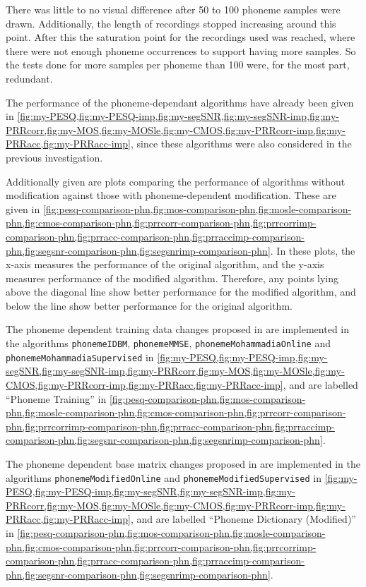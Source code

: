 There was little to no visual difference after 50 to 100 phoneme samples
were drawn. Additionally, the length of recordings stopped increasing
around this point. After this the saturation point for the recordings
used was reached, where there were not enough phoneme occurrences
to support having more samples. So the tests done for more samples
per phoneme than 100 were, for the most part, redundant.

The performance of the phoneme-dependant algorithms have already been
given in \cref{fig:my-PESQ,fig:my-PESQ-imp,fig:my-segSNR,fig:my-segSNR-imp,fig:my-PRRcorr,fig:my-MOS,fig:my-MOSle,fig:my-CMOS,fig:my-PRRcorr-imp,fig:my-PRRacc,fig:my-PRRacc-imp},
since these algorithms were also considered in the previous investigation.

Additionally given are plots comparing the performance of algorithms
without modification against those with phoneme-dependent modification.
These are given in \cref{fig:pesq-comparison-phn,fig:mos-comparison-phn,fig:mosle-comparison-phn,fig:cmos-comparison-phn,fig:prrcorr-comparison-phn,fig:prrcorrimp-comparison-phn,fig:prracc-comparison-phn,fig:prraccimp-comparison-phn,fig:segsnr-comparison-phn,fig:segsnrimp-comparison-phn}.
In these plots, the x-axis measures the performance of the original
algorithm, and the y-axis measures performance of the modified algorithm.
Therefore, any points lying above the diagonal line show better performance
for the modified algorithm, and below the line show better performance
for the original algorithm.

The phoneme dependent training data changes proposed in 
are implemented in the algorithms \lstinline[breaklines=true]!phonemeIDBM!,
\lstinline[breaklines=true]!phonemeMMSE!, \lstinline[breaklines=true]!phonemeMohammadiaOnline!
and\linebreak{}
\lstinline[breaklines=true]!phonemeMohammadiaSupervised! in \cref{fig:my-PESQ,fig:my-PESQ-imp,fig:my-segSNR,fig:my-segSNR-imp,fig:my-PRRcorr,fig:my-MOS,fig:my-MOSle,fig:my-CMOS,fig:my-PRRcorr-imp,fig:my-PRRacc,fig:my-PRRacc-imp},
and are labelled ``Phoneme Training'' in \cref{fig:pesq-comparison-phn,fig:mos-comparison-phn,fig:mosle-comparison-phn,fig:cmos-comparison-phn,fig:prrcorr-comparison-phn,fig:prrcorrimp-comparison-phn,fig:prracc-comparison-phn,fig:prraccimp-comparison-phn,fig:segsnr-comparison-phn,fig:segsnrimp-comparison-phn}.

The phoneme dependent base matrix changes proposed in 
are implemented in the algorithms \lstinline[breaklines=true]!phonemeModifiedOnline!
and \lstinline[breaklines=true]!phonemeModifiedSupervised! in \cref{fig:my-PESQ,fig:my-PESQ-imp,fig:my-segSNR,fig:my-segSNR-imp,fig:my-PRRcorr,fig:my-MOS,fig:my-MOSle,fig:my-CMOS,fig:my-PRRcorr-imp,fig:my-PRRacc,fig:my-PRRacc-imp},
and are labelled ``Phoneme Dictionary (Modified)'' in \cref{fig:pesq-comparison-phn,fig:mos-comparison-phn,fig:mosle-comparison-phn,fig:cmos-comparison-phn,fig:prrcorr-comparison-phn,fig:prrcorrimp-comparison-phn,fig:prracc-comparison-phn,fig:prraccimp-comparison-phn,fig:segsnr-comparison-phn,fig:segsnrimp-comparison-phn}.

